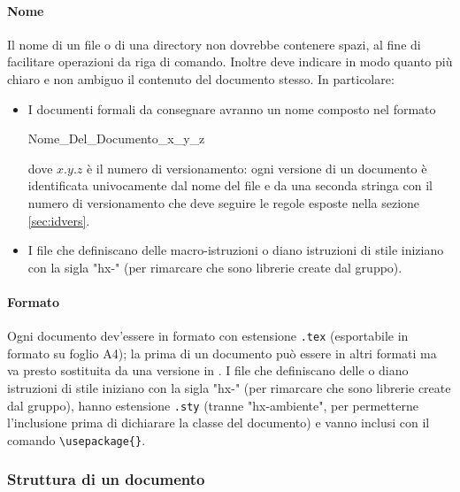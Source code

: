 \paragraph{Nome} Il nome di un file o di una directory non dovrebbe contenere spazi, al fine di facilitare operazioni da riga di comando. Inoltre deve indicare in modo quanto più chiaro e non ambiguo il contenuto del documento stesso. In particolare:
\begin{itemize}
	\item I documenti formali da consegnare avranno un nome composto nel formato
	\begin{center}
		Nome\_Del\_Documento\_x\_y\_z
	\end{center}
	dove $x.y.z$ è il numero di versionamento: ogni versione di un documento è identificata univocamente dal nome del file e da una seconda stringa con il numero di versionamento che deve seguire le regole esposte nella sezione \ref{sec:idvers}.
	\item I file  che definiscano delle macro-istruzioni o diano istruzioni di stile iniziano con la sigla "hx-" (per rimarcare che sono librerie create dal gruppo).
\end{itemize}
\paragraph{Formato} Ogni documento dev'essere in formato  con estensione \texttt{.tex} (esportabile in formato  su foglio A4); la prima  di un documento può essere in altri formati ma va presto sostituita da una versione in . I file  che definiscano delle  o diano istruzioni di stile iniziano con la sigla "hx-" (per rimarcare che sono librerie create dal gruppo), hanno estensione \texttt{.sty} (tranne "hx-ambiente", per permetterne l'inclusione prima di dichiarare la classe del documento) e vanno inclusi con il comando \texttt{\textbackslash usepackage\{\}}.

\subsubsection{Struttura di un documento}
